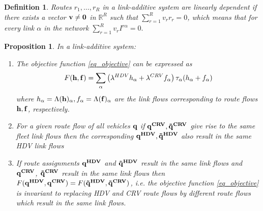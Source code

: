 \documentclass[a4paper,11pt]{article}
\newtheorem{proposition}[theorem]{Proposition}
\newtheorem{definition}[theorem]{Definition}
\begin{document}
\begin{definition}
Routes $r_1,\dots, r_R$ in a link-additive system are \emph{linearly dependent} if there exists a vector $\bold{v} \neq \bold{0}$ in $\mathbb{R}^R$ such that  $\sum_{r=1}^R v_r r_r = 0$, which means that for every link $\alpha$ in the network $\sum_{r=1}^R v_r I^{r\alpha} = 0.$
\end{definition}
\begin{proposition}
\label{Prop_SLF}
In a link-additive system:
\begin{enumerate}
\item[i)] The objective function \eqref{eq_objective} can be expressed as 
\begin{equation}
\label{eq_objlink}
F(\bold{h},\bold{f}) = \sum_{\alpha} \left(\lambda^{HDV}h_\alpha + \lambda^{CRV}f_\alpha \right)\tau_\alpha(h_\alpha+f_\alpha)
\end{equation} 
where $h_\alpha = \Lambda(\bold{h})_\alpha, f_\alpha = \Lambda(\bold{f})_\alpha$ are the link flows corresponding to route flows $\bold{h}, \bold{f}$, respectively. 
 
\item[ii)] For a given route flow of all vehicles $\bold{q}$ if $\bold{q^{CRV}}, \bold{\tilde{q}^{CRV}}$ give rise to the same fleet link flows then the corresponding $\bold{q^{HDV}}, \bold{\tilde{q}^{HDV}}$ also result in the same HDV link flows

\item[iii)] If route assignments $\bold{q^{HDV}}$ and $\bold{\tilde{q}^{HDV}}$ result in the same link flows and $\bold{q^{CRV}}$, $\bold{\tilde{q}^{CRV}}$ result in the same link flows then $F(\bold{q^{HDV}}, \bold{q^{CRV}}) = F(\bold{\tilde{q}^{HDV}}, \bold{\tilde{q}^{CRV}})$, i.e. the objective function \eqref{eq_objective} is invariant to replacing HDV and CRV route flows by different route flows which result in the same link flows.  
\end{enumerate}
\end{proposition}
\end{document}
